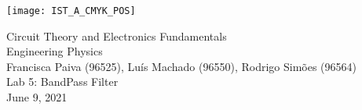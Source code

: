
\thispagestyle {empty}

\texttt{[image: IST\_A\_CMYK\_POS]}

\begin{center}
%
\vspace{1.0cm}

\vspace{1cm}
{\FontLb Circuit Theory and Electronics Fundamentals} \\ %
\vspace{1cm}
{\FontSn Engineering Physics} \\ %
{\small Francisca Paiva (96525), Luís Machado (96550), Rodrigo Simões (96564)} \\
\vspace{1cm}
{\FontSn Lab 5: BandPass Filter} \\
\vspace{1cm}
{\FontSn June 9, 2021} \\ %
%
\end{center}
